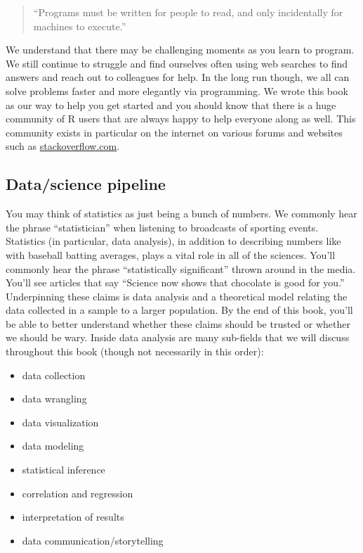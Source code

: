 \documentclass[
  letterpaper,
  DIV=11,
  numbers=noendperiod]{scrreprt}
\providecommand{\tightlist}{%
  \setlength{\itemsep}{0pt}\setlength{\parskip}{0pt}}\usepackage{longtable,booktabs,array}
\theoremstyle{definition}
\theoremstyle{remark}
\begin{document}
\begin{quote}
``Programs must be written for people to read, and only incidentally for
machines to execute.''
\end{quote}

We understand that there may be challenging moments as you learn to
program. We still continue to struggle and find ourselves often using
web searches to find answers and reach out to colleagues for help. In
the long run though, we all can solve problems faster and more elegantly
via programming. We wrote this book as our way to help you get started
and you should know that there is a huge community of R users that are
always happy to help everyone along as well. This community exists in
particular on the internet on various forums and websites such as
\href{https://stackoverflow.com/}{stackoverflow.com}.

\hypertarget{datascience-pipeline}{%
\subsection*{Data/science pipeline}\label{datascience-pipeline}}

You may think of statistics as just being a bunch of numbers. We
commonly hear the phrase ``statistician'' when listening to broadcasts
of sporting events. Statistics (in particular, data analysis), in
addition to describing numbers like with baseball batting averages,
plays a vital role in all of the sciences. You'll commonly hear the
phrase ``statistically significant'' thrown around in the media. You'll
see articles that say ``Science now shows that chocolate is good for
you.'' Underpinning these claims is data analysis and a theoretical
model relating the data collected in a sample to a larger population. By
the end of this book, you'll be able to better understand whether these
claims should be trusted or whether we should be wary. Inside data
analysis are many sub-fields that we will discuss throughout this book
(though not necessarily in this order):

\begin{itemize}
\tightlist
\item
  data collection
\item
  data wrangling
\item
  data visualization
\item
  data modeling
\item
  statistical inference
\item
  correlation and regression
\item
  interpretation of results
\item
  data communication/storytelling
\end{itemize}
\end{document}
